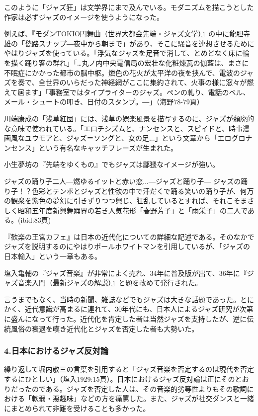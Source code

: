 このように「ジャズ狂」は文学界にまで及んでいる。モダニズムを描こうとした作家は必ずジャズのイメージを使うようになった。

例えば、『モダンTOKIO円舞曲（世界大都会先端・ジャズ文学）』の中に龍胆寺雄の「甃路スナップ―夜中から朝まで」があり、そこに騒音を連想させるためにやはりジャズを使っている。「浮気なジャズを足音で消して、とめどなく床に輪を描く踊り客の群れ」「…丸ノ内中央電信局の宏壮な化粧煉瓦の伽藍は、まさに不眠症にかかった都市の脳中枢。燐色の花火が太平洋の夜を挟んで、電波のジャズを奏で、全世界のいらだった神経網がここに集約されて、火事の様に窓々が燃えて居ます」「事務室ではタイプライターのジャズ。ペンの軋り、電話のベル、メール・シュートの叩き、日付のスタンプ。―」（海野78-79頁）

川端康成の「浅草紅団」には、浅草の娯楽風景を描写するのに、ジャズが頽廃的な意味で使われている。「エロチシズムと、ナンセンスと、スピイドと、時事漫画風なユウモアと、ジャズ＝ソングと、女の足...」という文章から「エログロナンセンス」という有名なキャッチフレーズが生まれた。

小生夢坊の『先端をゆくもの』でもジャズは鄙猥なイメージが強い。

\begin{gquote}
ジャズの踊り子二人―燃ゆるイットと赤い恋...―ジャズと踊り子― ジャズの踊り子！？色彩とテンポとジャズと性欲の中で汗だくで踊る笑いの踊り子が、何万の観衆を紫色の夢幻に引きずりつつ興じ、狂乱しているとすれば、それこそまさしく昭和五年度新興舞踊界の若き人気花形「春野芳子」と「雨栄子」の二人である。(ibid:83頁)
\end{gquote}

『歓楽の王宮カフェ』は日本の近代化についての詳細な記述である。そのなかでジャズを説明するのにやはりポールホワイトマンを引用しているが、「ジャズの日本輸入」という一章もある。

塩入亀輔の『ジャズ音楽』が非常によく売れ、34年に普及版が出て、36年に『ジャズ音楽入門（最新ジャズの解説）』と題を改めて発行された。

言うまでもなく、当時の新聞、雑誌などでもジャズは大きな話題であった。とにかく、近代意識が高まるに連れて、30年代にも、日本人によるジャズ研究が次第に盛んになって行った。近代化を肯定した者は当然ジャズを支持したが、逆に伝統風俗の衰退を嘆き近代化とジャズを否定した者も大勢いた。

\subsubsection{4.日本におけるジャズ反対論}

繰り返して堀内敬三の言葉を引用すると「ジャズ音楽を否定するのは現代を否定するにひとしい」（塩入1929:15頁）。日本におけるジャズ反対論は正にそのとおりだったのである。ジャズを否定した人は、その音楽的劣等性よりもその歌詞における「軟弱・悪趣味」などの方を痛罵した。また、ジャズが社交ダンスと一緒にまとめられて非難を受けることも多かった。

